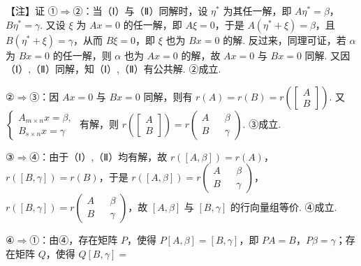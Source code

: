 
\begin{fnote}
【注】证 ①$\Rightarrow$②：当（Ⅰ）与（Ⅱ）同解时，设 $\eta^{*}$ 为其任一解，即 $A\eta^{*}=\beta$，$B\eta^{*}=\gamma$. 又设 $\xi$ 为 $Ax=0$ 的任一解，即 $A\xi=0$，于是 $A(\eta^{*}+\xi)=\beta$，且 $B(\eta^{*}+\xi)=\gamma$，从而 $B\xi=0$，即 $\xi$ 也为 $Bx=0$ 的解. 反过来，同理可证，若 $\alpha$ 为 $Bx=0$ 的任一解，则 $\alpha$ 也为 $Ax=0$ 的解，故 $Ax=0$ 与 $Bx=0$ 同解. 又因（Ⅰ）,（Ⅱ）同解，知（Ⅰ）,（Ⅱ）有公共解. ②成立.

②$\Rightarrow$③：因 $Ax=0$ 与 $Bx=0$ 同解，则有 $r(A)=r(B)=r\left(\begin{bmatrix}A\\B\end{bmatrix}\right)$. 又 $\begin{cases}A_{m\times n}x=\beta,\\B_{s\times n}x=\gamma\end{cases}$ 有解，则 $r\left(\begin{bmatrix}A\\B\end{bmatrix}\right)=r\left(\begin{array}{cc|c}A&&\beta\\\hline B&&\gamma\end{array}\right)$. ③成立.

③$\Rightarrow$④：由于（Ⅰ）,（Ⅱ）均有解，故 $r([A,\beta])=r(A)$，$r([B,\gamma])=r(B)$，于是 $r([A,\beta])=r\left(\begin{array}{cc|c}A&&\beta\\\hline B&&\gamma\end{array}\right)$，$r([B,\gamma])=r\left(\begin{array}{cc|c}A&&\beta\\\hline B&&\gamma\end{array}\right)$，故 $[A,\beta]$ 与 $[B,\gamma]$ 的行向量组等价. ④成立.

④$\Rightarrow$①：由④，存在矩阵 $P$，使得 $P[A,\beta]=[B,\gamma]$，即 $PA=B$，$P\beta=\gamma$；存在矩阵 $Q$，使得 $Q[B,\gamma]=$
\end{fnote}

